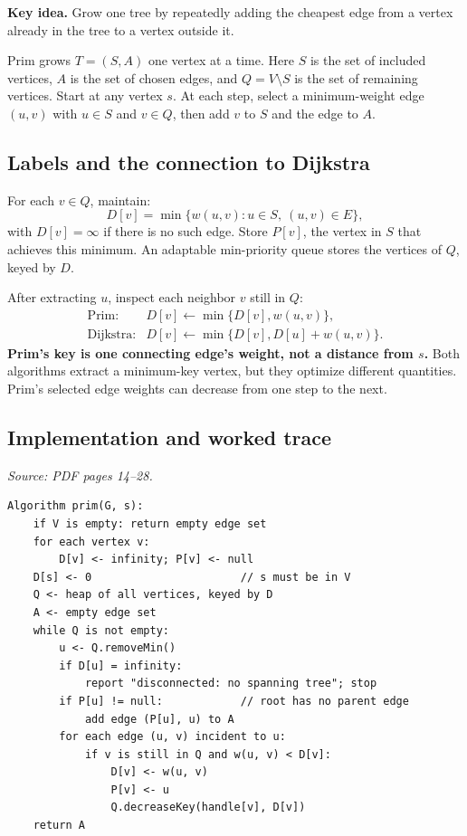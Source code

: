 \documentclass[11pt,letterpaper]{article}
\newcommand{\sourcepages}[1]{\textit{Source: PDF pages #1.}}
\newcommand{\keyidea}[1]{\par\textbf{Key idea.} #1\par}
\begin{document}
\keyidea{Grow one tree by repeatedly adding the cheapest edge from a vertex already in the tree to a vertex outside it.}

Prim grows $T=(S,A)$ one vertex at a time. Here $S$ is the set of included vertices, $A$ is the set of chosen edges, and $Q=V\setminus S$ is the set of remaining vertices. Start at any vertex $s$. At each step, select a minimum-weight edge $(u,v)$ with $u\in S$ and $v\in Q$, then add $v$ to $S$ and the edge to $A$.

\subsection{Labels and the connection to Dijkstra}
For each $v\in Q$, maintain:
\[
 D[v]=\min\{w(u,v):u\in S,\ (u,v)\in E\},
\]
with $D[v]=\infty$ if there is no such edge. Store $P[v]$, the vertex in $S$ that achieves this minimum. An adaptable min-priority queue stores the vertices of $Q$, keyed by $D$.

After extracting $u$, inspect each neighbor $v$ still in $Q$:
\[
\begin{array}{ll}
\text{Prim:} & D[v]\gets\min\{D[v],w(u,v)\},\\[2pt]
\text{Dijkstra:} & D[v]\gets\min\{D[v],D[u]+w(u,v)\}.
\end{array}
\]
\textbf{Prim's key is one connecting edge's weight, not a distance from $s$.}
Both algorithms extract a minimum-key vertex, but they optimize different quantities. Prim's selected edge weights can decrease from one step to the next.

\newpage
\subsection{Implementation and worked trace}
\sourcepages{14--28}

\begin{lstlisting}[caption={Prim using an adaptable binary min-heap}]
Algorithm prim(G, s):
    if V is empty: return empty edge set
    for each vertex v:
        D[v] <- infinity; P[v] <- null
    D[s] <- 0                       // s must be in V
    Q <- heap of all vertices, keyed by D
    A <- empty edge set
    while Q is not empty:
        u <- Q.removeMin()
        if D[u] = infinity:
            report "disconnected: no spanning tree"; stop
        if P[u] != null:            // root has no parent edge
            add edge (P[u], u) to A
        for each edge (u, v) incident to u:
            if v is still in Q and w(u, v) < D[v]:
                D[v] <- w(u, v)
                P[v] <- u
                Q.decreaseKey(handle[v], D[v])
    return A
\end{lstlisting}
\end{document}
